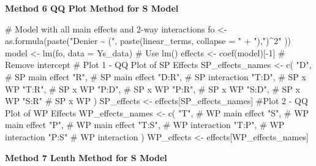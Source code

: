 \documentclass[
  letterpaper,
  DIV=11,
  numbers=noendperiod]{scrartcl}
\newenvironment{Shaded}{\begin{snugshade}}{\end{snugshade}}
\newcommand{\AttributeTok}[1]{\textcolor[rgb]{0.40,0.45,0.13}{#1}}
\newcommand{\CommentTok}[1]{\textcolor[rgb]{0.37,0.37,0.37}{#1}}
\newcommand{\DecValTok}[1]{\textcolor[rgb]{0.68,0.00,0.00}{#1}}
\newcommand{\FunctionTok}[1]{\textcolor[rgb]{0.28,0.35,0.67}{#1}}
\newcommand{\NormalTok}[1]{\textcolor[rgb]{0.00,0.23,0.31}{#1}}
\newcommand{\OtherTok}[1]{\textcolor[rgb]{0.00,0.23,0.31}{#1}}
\newcommand{\SpecialCharTok}[1]{\textcolor[rgb]{0.37,0.37,0.37}{#1}}
\newcommand{\StringTok}[1]{\textcolor[rgb]{0.13,0.47,0.30}{#1}}
\begin{document}
\textbf{Method 6 QQ Plot Method for S Model}

\begin{Shaded}
\begin{Highlighting}[]
\CommentTok{\# Model with all main effects and 2{-}way interactions}
\NormalTok{fo }\OtherTok{\textless{}{-}} \FunctionTok{as.formula}\NormalTok{(}\FunctionTok{paste}\NormalTok{(}\StringTok{"Denier \textasciitilde{} ("}\NormalTok{, }
    \FunctionTok{paste}\NormalTok{(linear\_terms, }\AttributeTok{collapse =} \StringTok{" + "}\NormalTok{),}\StringTok{")\^{}2"}
\NormalTok{  ))}
\NormalTok{model }\OtherTok{\textless{}{-}} \FunctionTok{lm}\NormalTok{(fo, }\AttributeTok{data =}\NormalTok{ Ys\_data)  }\CommentTok{\# Use lm()}
\NormalTok{effects }\OtherTok{\textless{}{-}} \FunctionTok{coef}\NormalTok{(model)[}\SpecialCharTok{{-}}\DecValTok{1}\NormalTok{]    }\CommentTok{\# Remove intercept}
\CommentTok{\# Plot 1 {-} QQ Plot of SP Effects}
\NormalTok{SP\_effects\_names }\OtherTok{\textless{}{-}} \FunctionTok{c}\NormalTok{(}
  \StringTok{"D"}\NormalTok{,    }\CommentTok{\# SP main effect}
  \StringTok{"R"}\NormalTok{,    }\CommentTok{\# SP main effect}
  \StringTok{"D:R"}\NormalTok{,  }\CommentTok{\# SP interaction}
  \StringTok{"T:D"}\NormalTok{,  }\CommentTok{\# SP x WP}
  \StringTok{"T:R"}\NormalTok{,  }\CommentTok{\# SP x WP}
  \StringTok{"P:D"}\NormalTok{,  }\CommentTok{\# SP x WP}
  \StringTok{"P:R"}\NormalTok{,  }\CommentTok{\# SP x WP}
  \StringTok{"S:D"}\NormalTok{,  }\CommentTok{\# SP x WP}
  \StringTok{"S:R"}   \CommentTok{\# SP x WP}
\NormalTok{)}
\NormalTok{SP\_effects }\OtherTok{\textless{}{-}}\NormalTok{ effects[SP\_effects\_names]}
\CommentTok{\#Plot 2 {-} QQ Plot of WP Effects}
\NormalTok{WP\_effects\_names }\OtherTok{\textless{}{-}} \FunctionTok{c}\NormalTok{(}
  \StringTok{"T"}\NormalTok{,    }\CommentTok{\# WP main effect}
  \StringTok{"S"}\NormalTok{,    }\CommentTok{\# WP main effect}
  \StringTok{"P"}\NormalTok{,    }\CommentTok{\# WP main effect}
  \StringTok{"T:S"}\NormalTok{,  }\CommentTok{\# WP interaction}
  \StringTok{"T:P"}\NormalTok{,  }\CommentTok{\# WP interaction}
  \StringTok{"P:S"}   \CommentTok{\# WP interaction}
\NormalTok{)}
\NormalTok{WP\_effects }\OtherTok{\textless{}{-}}\NormalTok{ effects[WP\_effects\_names]}
\end{Highlighting}
\end{Shaded}

\textbf{Method 7 Lenth Method for S Model}
\end{document}
